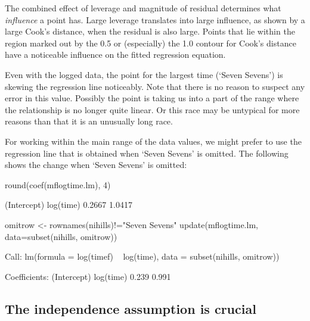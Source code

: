 The combined
effect of leverage and magnitude of residual determines
what {\em influence} a point has.  Large leverage translates into
large influence, as shown by a large Cook's distance, when the
residual is also large.  Points that lie within the region marked out
by the 0.5 or (especially) the 1.0 contour for Cook's distance have a
noticeable influence on the fitted regression equation.  

Even with the logged data, the point for the largest time (`Seven Sevens') is
skewing the regression line noticeably.
Note that there is no reason to suspect any error in this value.  Possibly
the point is taking us into a part of the range where the relationship
is no longer quite linear.  Or this race may be untypical for more
reasons than that it is an unusually long race.

For working within the main range of the data values, we
  might prefer to use the regression line that is obtained when `Seven
  Sevens' is omitted. 
The following shows the change when `Seven Sevens' is omitted:
\begin{fullwidth}

\begin{Schunk}
\begin{Sinput}
round(coef(mflogtime.lm), 4)
\end{Sinput}
\begin{Soutput}
(Intercept)   log(time) 
     0.2667      1.0417 
\end{Soutput}
\begin{Sinput}
omitrow <- rownames(nihills)!="Seven Sevens"
update(mflogtime.lm, data=subset(nihills, omitrow))
\end{Sinput}
\begin{Soutput}

Call:
lm(formula = log(timef) ~ log(time), data = subset(nihills, omitrow))

Coefficients:
(Intercept)    log(time)  
      0.239        0.991  
\end{Soutput}
\end{Schunk}

\end{fullwidth}

 \subsection{The independence assumption is crucial}

